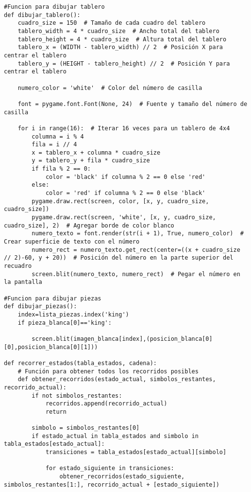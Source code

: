 \begin{enumerate}
\begin{lstlisting}
#Funcion para dibujar tablero
def dibujar_tablero():
    cuadro_size = 150  # Tamaño de cada cuadro del tablero
    tablero_width = 4 * cuadro_size  # Ancho total del tablero
    tablero_height = 4 * cuadro_size  # Altura total del tablero
    tablero_x = (WIDTH - tablero_width) // 2  # Posición X para centrar el tablero
    tablero_y = (HEIGHT - tablero_height) // 2  # Posición Y para centrar el tablero
    
    numero_color = 'white'  # Color del número de casilla

    font = pygame.font.Font(None, 24)  # Fuente y tamaño del número de casilla

    for i in range(16):  # Iterar 16 veces para un tablero de 4x4
        columna = i % 4
        fila = i // 4
        x = tablero_x + columna * cuadro_size
        y = tablero_y + fila * cuadro_size
        if fila % 2 == 0:
            color = 'black' if columna % 2 == 0 else 'red'
        else:
            color = 'red' if columna % 2 == 0 else 'black'
        pygame.draw.rect(screen, color, [x, y, cuadro_size, cuadro_size])
        pygame.draw.rect(screen, 'white', [x, y, cuadro_size, cuadro_size], 2)  # Agregar borde de color blanco
        numero_texto = font.render(str(i + 1), True, numero_color)  # Crear superficie de texto con el número
        numero_rect = numero_texto.get_rect(center=((x + cuadro_size // 2)-60, y + 20))  # Posición del número en la parte superior del recuadro
        screen.blit(numero_texto, numero_rect)  # Pegar el número en la pantalla

#Funcion para dibujar piezas
def dibujar_piezas():
    index=lista_piezas.index('king')
    if pieza_blanca[0]=='king':     
        
        screen.blit(imagen_blanca[index],(posicion_blanca[0][0],posicion_blanca[0][1]))
           
def recorrer_estados(tabla_estados, cadena):
    # Función para obtener todos los recorridos posibles
    def obtener_recorridos(estado_actual, simbolos_restantes, recorrido_actual):
        if not simbolos_restantes:
            recorridos.append(recorrido_actual)
            return

        simbolo = simbolos_restantes[0]
        if estado_actual in tabla_estados and simbolo in tabla_estados[estado_actual]:
            transiciones = tabla_estados[estado_actual][simbolo]

            for estado_siguiente in transiciones:
                obtener_recorridos(estado_siguiente, simbolos_restantes[1:], recorrido_actual + [estado_siguiente])


\end{lstlisting}
\end{enumerate}
